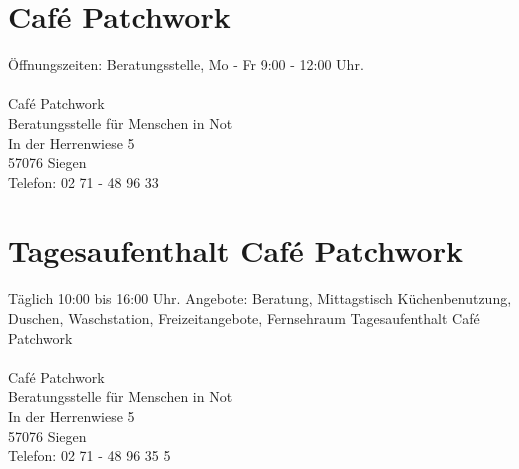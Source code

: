 \section{Café Patchwork}
Öffnungszeiten:  Beratungsstelle, Mo - Fr 9:00 - 12:00 Uhr.\\
\\
Café Patchwork \\
Beratungsstelle für Menschen in Not\\
In der Herrenwiese 5\\
57076 Siegen\\
Telefon: 02 71 - 48 96 33

\section{Tagesaufenthalt Café Patchwork}
Täglich 10:00 bis 16:00 Uhr. Angebote: Beratung, Mittagstisch Küchenbenutzung, Duschen, Waschstation, Freizeitangebote, Fernsehraum 
Tagesaufenthalt Café Patchwork\\
\\
Café Patchwork \\
Beratungsstelle für Menschen in Not\\
In der Herrenwiese 5\\
57076 Siegen\\
Telefon: 02 71 - 48 96 35 5